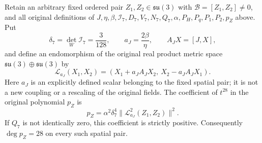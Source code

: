 \begin{proposition}
Retain an arbitrary fixed ordered pair
$Z_1,Z_2\in\mathfrak{su}(3)$ with $\mathscr B=[Z_1,Z_2]\ne0$,
and all original definitions of $J,\eta,\beta,\mathcal I_7,
D_7,V_7,N_7,Q_7,\alpha,P_H,P_q,P_1,P_2,p_Z$ above.
Put
\[
 \delta_7=\det_W\mathcal I_7=\frac3{128},\qquad
 a_J=\frac{2\beta}{\eta},\qquad A_JX=[J,X],
\]
and define an endomorphism of the original real product metric space
$\mathfrak{su}(3)\oplus\mathfrak{su}(3)$ by
\[
 \mathcal L_{a_J}(X_1,X_2)
    =(X_1+a_J A_JX_2,\ X_2-a_J A_JX_1).
\]
Here $a_J$ is an explicitly defined scalar belonging to the fixed spatial
pair; it is not a new coupling or a rescaling of the original fields.
The coefficient of $t^{28}$ in the original polynomial $p_Z$ is
\begin{equation}
 [t^{28}]p_Z
 =\alpha^2\delta_7^4
   \bigl\|\mathcal L_{a_J}^2(Z_1,Z_2)\bigr\|^2.
 \label{q444:audit-exact-leading-coefficient}
\end{equation}
If $Q_7$ is not identically zero, this coefficient is strictly positive.
Consequently $\deg p_Z=28$ on every such spatial pair.
\end{proposition}
